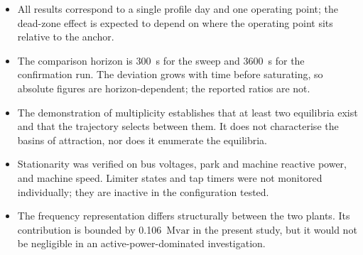 \documentclass[11pt,a4paper]{article}
\newcommand{\Mvar}{\ensuremath{\mathrm{Mvar}}}
\begin{document}
\begin{itemize}
  \item All results correspond to a single profile day and one operating
        point; the dead-zone effect is expected to depend on where the
        operating point sits relative to the anchor.
  \item The comparison horizon is \SI{300}{\second} for the sweep and
        \SI{3600}{\second} for the confirmation run. The deviation grows
        with time before saturating, so absolute figures are
        horizon-dependent; the reported ratios are not.
  \item The demonstration of multiplicity establishes that at least two
        equilibria exist and that the trajectory selects between them. It
        does not characterise the basins of attraction, nor does it
        enumerate the equilibria.
  \item Stationarity was verified on bus voltages, park and machine
        reactive power, and machine speed. Limiter states and tap timers
        were not monitored individually; they are inactive in the
        configuration tested.
  \item The frequency representation differs structurally between the two
        plants. Its contribution is bounded by \SI{0.106}{\Mvar} in the
        present study, but it would not be negligible in an
        active-power-dominated investigation.
\end{itemize}
\end{document}
